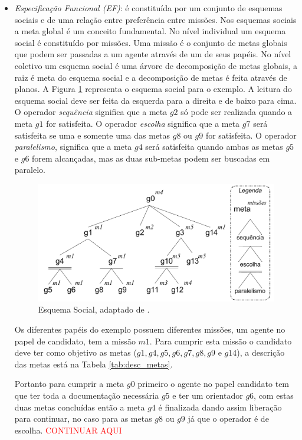 \begin{itemize}
\item {\it Especificação Funcional (EF)}: é constituída por um conjunto de esquemas sociais e de uma relação entre preferência entre missões. Nos esquemas sociais a meta global é um conceito fundamental. No nível individual um esquema social é constituído por missões. Uma missão é o conjunto de metas globais que podem ser passadas a um agente através de um de seus papéis. No nível coletivo um esquema social é uma árvore de decomposição de metas globais, a raiz é meta do esquema social e a decomposição de metas é feita através de planos. A Figura \ref{fig:es_exemplo} representa o esquema social para o exemplo. A leitura do esquema social deve ser feita da esquerda para a direita e de baixo para cima. O operador \textit{sequência} significa que a meta $g2$ só pode ser realizada quando a meta $g1$ for satisfeita. O operador \textit{escolha} significa que a meta $g7$ será satisfeita se uma e somente uma das metas $g8$ ou $g9$ for satisfeita. O operador \textit{paralelismo}, significa que a meta $g4$ será satisfeita quando ambas as metas $g5$ e $g6$ forem alcançadas, mas as duas sub-metas podem ser buscadas em paralelo. 
\begin{figure}[ht]
\centering
\includegraphics[scale=0.4]{imagens/ES2.pdf}
\caption{Esquema Social, adaptado de \cite{hubner2003modelo}.}
\label{fig:es_exemplo}
\end{figure}

Os diferentes papéis do exemplo possuem diferentes missões, um agente no papel de candidato, tem a missão $m1$. Para cumprir esta missão o candidato deve ter como objetivo as metas ($g1, g4, g5, g6, g7, g8, g9$ e $g14$), a descrição das metas está na Tabela \ref{tab:desc_metas}.

Portanto para cumprir a meta $g0$ primeiro o agente no papel candidato tem que ter toda a documentação necessária $g5$ e ter um orientador $g6$, com estas duas metas concluídas então a meta $g4$ é finalizada dando assim liberação para continuar, no caso para as metas $g8$ ou $g9$ já que o operador é de escolha. \textcolor{red}{CONTINUAR AQUI} 


\end{itemize}
